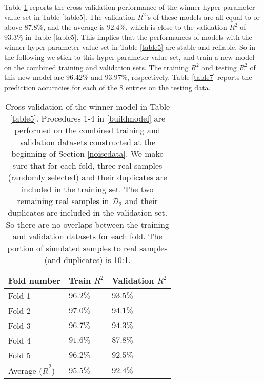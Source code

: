 \documentclass[thmsa,onecolumn,12pt]{article}%
\begin{document}
Table \ref{table6} reports the cross-validation performance of the winner hyper-parameter value set in Table \ref{table5}. The validation $R^2$'s of these models are all equal to or above $87.8\%$, and the average is $92.4\%$, which is close to the validation $R^2$ of $93.3\%$ in Table \ref{table5}. This implies that the performances of models with the winner hyper-parameter value set in Table \ref{table5} are stable and reliable. So in the following we stick to this hyper-parameter value set, and train a new model on the combined training and validation sets. The training $R^2$ and testing $R^2$ of this new model are $96.42\%$ and $93.97\%$, respectively. Table \ref{table7} reports the prediction accuracies for each of the 8 entries on the testing data.


\begin{table}[H]
\caption{Cross validation of the winner model in Table \ref{table5}. Procedures 1-4 in \ref{buildmodel} are performed on the combined training and validation datasets constructed at the beginning of Section \ref{noisedata}. We make sure that for each fold, three real samples (randomly selected) and their duplicates are included in the training set. The two remaining real samples in $\mathcal{D}_2$ and their duplicates are included in the validation set. So there are no overlaps between the training and validation datasets for each fold. The portion of simulated samples to real samples (and duplicates) is 10:1. }
\label{table6}
\centering%
\begin{tabular}{ p{3cm}  p{3cm}p{3cm}  }
\toprule%
Fold number                 & Train $R^2$  & Validation $R^2$\\
\toprule
Fold 1      				 &$96.2\%$        &$93.5\%$ \\
Fold 2      				 &$97.0\%$        &$94.1\%$ \\
Fold 3      				 &$96.7\%$        &$94.3\%$ \\
Fold 4       			&$91.6\%$        &$87.8\%$ \\
Fold 5      				 &$96.2\%$        &$92.5\%$ \\
Average ($\bar{R}^2$)   			&$95.5\%$        &$92.4\%$\\
\bottomrule
\end{tabular}
\end{table}
\end{document}
